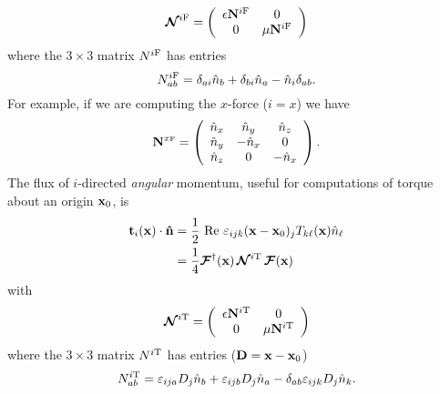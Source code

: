\documentclass[letterpaper]{article}
\newcommand{\IF}{^{i\text{\scriptsize F}}}
\newcommand{\IT}{^{i\text{\scriptsize T}}}
\begin{document}
$$
   \bmc N\IF=
   \left(\begin{array}{cc}
   \epsilon \vb N\IF & 0 \\
            0        & \mu \vb N\IF 
   \end{array}\right)
$$
where the $3\times 3$ matrix $N\IF$ has entries
$$ N\IF_{ab} = 
   \delta_{ai} \hat{n}_b + \delta_{bi} \hat{n}_a
  - \hat{n}_i \delta_{ab}.
$$
For example, if we are computing the $x$-force ($i=x$)
we have 
$$ \mathbf{N}^{x\text{\tiny F}}=\left(\begin{array}{ccc}
   \hat{n}_x & \hat n_y   & \hat n_z \\
   \hat{n}_y & -\hat{n}_x & 0 \\
   \hat{n}_z & 0          & -\hat{n}_x
  \end{array}\right).
$$
The flux of $i$-directed \textit{angular} momentum, useful
for computations of torque about an origin $\mathbf{x}_0$, is
\begin{align}
 \vb t_{i}(\vb x) \cdot \vbhat{n}
&=\frac{1}{2}
  \text{ Re }
  \varepsilon_{ijk}(\vb x-\vb x_0)_j T_{k\ell}(\vb x) \hat{n}_\ell
\\
&= \frac{1}{4}\bmc{F}^\dagger(\vb x) 
   \, \bmc{N}\IT \, \bmc{F}(\vb x)
\label{ITVMVP}
\end{align}
with 
$$
   \bmc N\IT=
   \left(\begin{array}{cc}
   \epsilon \vb N\IT & 0 \\
            0        & \mu \vb N\IT 
   \end{array}\right)
$$
where the $3\times 3$ matrix $N\IT$ has entries ($\mathbf{D}=\mathbf{x}-\mathbf{x}_0$)
$$ N\IT_{ab}=
   \varepsilon_{ija}D_j \hat{n}_b
  +\varepsilon_{ijb}D_j \hat{n}_a
  -\delta_{ab} \varepsilon_{ijk} D_j \hat{n}_k.
$$

\end{document}
